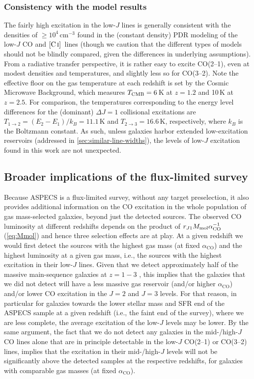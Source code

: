 \documentclass[twocolumn]{aastex62}
\newcommand{\aco}{\ensuremath{\alpha_{\mathrm{CO}}}}
\newcommand{\CI}{\ensuremath{\mathrm{[C\, \textsc{i}]}}}
\begin{document}
\subsubsection{Consistency with the model results}
\label{sec:link-with-pdr}
The fairly high excitation in the low-$J$ lines is generally consistent with
the densities of $\ge 10^{4}$\,cm$^{-3}$ found in the (constant density) PDR
modeling of the low-$J$ CO and \CI\ lines (though we caution that the different
types of models should not be blindly compared, given the differences in
underlying assumptions).  From a radiative transfer perspective, it is rather
easy to excite CO(2--1), even at modest densities and temperatures, and
slightly less so for CO(3--2).  Note the effective floor on the gas temperature
at each redshift is set by the Cosmic Microwave Background, which measures
$T_{\rm CMB} = 6$\,K at $z=1.2$ and 10\,K at $z=2.5$.  For comparison, the
temperatures corresponding to the energy level differences for the (dominant)
$\Delta J=1$ collisional excitations are
$T_{1 \rightarrow 2} = (E_{2} - E_{1})/k_{B} = 11.1$\,K and
$T_{2 \rightarrow 3} = 16.6$\,K, respectively, where $k_{B}$ is the Boltzmann
constant.  As such, unless galaxies harbor extended low-excitation reservoirs
(addressed in \autoref{sec:similar-line-widths}), the levels of low-$J$
excitation found in this work are not unexpected.

\subsection{Broader implications of the flux-limited survey}
\label{sec:impl-flux-limit}
Because ASPECS is a flux-limited survey, without any target preselection, it
also provides additional information on the CO excitation in the whole
population of gas mass-selected galaxies, beyond just the detected sources.
The observed CO luminosity at different redshifts depends on the product of
$r_{J1} M_{\rm mol} \aco^{-1}$ (\autoref{eq:Mmol}) and hence three selection
effects are at play.  At a given redshift we would first detect the sources
with the highest gas mass (at fixed \aco) and the highest luminosity at a given
gas mass, i.e., the sources with the highest excitation in their low-$J$ lines.
Given that we detect approximately half of the massive main-sequence galaxies
at $z=1-3$ \citep{Boogaard2019}, this implies that the galaxies that we did not
detect will have a less massive gas reservoir (and/or higher \aco) and/or lower
CO excitation in the $J=2$ and $J=3$ levels.  For that reason, in particular
for galaxies towards the lower stellar mass and SFR end of the ASPECS sample at
a given redshift (i.e., the faint end of the survey), where we are less
complete, the average excitation of the low-$J$ levels may be lower.  By the
same argument, the fact that we do not detect any galaxies in the mid-/high-$J$
CO lines alone that are in principle detectable in the low-$J$ CO(2--1) or
CO(3--2) lines, implies that the excitation in their mid-/high-$J$ levels will
not be significantly above the detected samples at the respective redshifts,
for galaxies with comparable gas masses (at fixed \aco).
\end{document}
